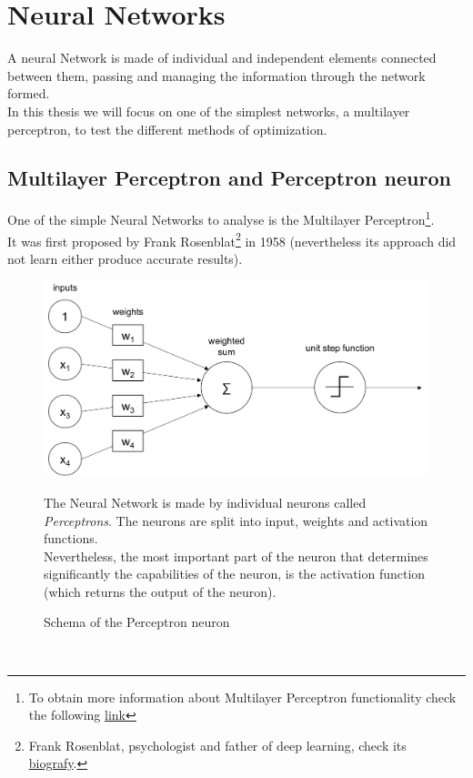 \documentclass[a4paper, 11pt]{article}
\begin{document}
\newpage
\section{Neural Networks} 
A neural Network is made of individual and independent elements connected between them, passing and managing the information through the network formed.\\
In this thesis we will focus on one of the simplest networks, a multilayer perceptron, to test the different methods of optimization.


\subsection{Multilayer Perceptron and Perceptron neuron}
One of the simple Neural Networks to analyse is the Multilayer Perceptron\footnote{To obtain more information about Multilayer Perceptron functionality check the following \href{https://en.wikipedia.org/wiki/Multilayer_perceptron}{link}}.\\
It was first proposed by Frank Rosenblat\footnote{Frank Rosenblat, psychologist and father of deep learning, check its \href{https://en.wikipedia.org/wiki/Frank_Rosenblat}{biografy}.} in 1958 (nevertheless its approach did not learn either produce accurate results).
\begin{figure}[h]
    \begin{minipage}{9cm}
        \begin{center}
            \includegraphics[width = 1 \textwidth]{Neural_Network/perceptron_schema.png}
            \caption{Schema of the Perceptron neuron}
        \end{center} 
    \end{minipage}
    \hspace{1em}
    \begin{minipage}{5cm}
        The Neural Network is made by individual neurons called \textit{Perceptrons}. The neurons are split into input, weights and activation functions.\\
        Nevertheless, the most important part of the neuron that determines significantly the capabilities of the neuron, is the activation function (which returns the output of the neuron).
    \end{minipage}
\end{figure}\\
\end{document}
